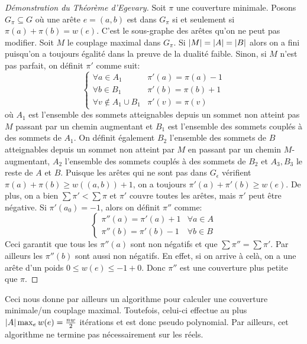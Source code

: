 \documentclass[math, info]{cours}
\begin{document}
\begin{proof}[Démonstration du Théorème d'Egevary]
	Soit $\pi$ une couverture minimale.
	Posons $G_{\pi} \subseteq G$ où une arête $e = (a, b)$ est dans $G_{\pi}$ si et seulement si $\pi(a) + \pi(b) = w(e)$.
	C'est le sous-graphe des arêtes qu'on ne peut pas modifier.
	Soit $M$ le couplage maximal dans $G_{\pi}$.
	Si $\left|M\right| = \left|A\right| = \left|B\right|$ alors on a fini puisqu'on a toujours égalité dans la preuve de la dualité faible.
	Sinon, si $M$ n'est pas parfait, on définit $\pi'$ comme suit:
	\begin{equation*}
		\begin{cases}
			\forall a \in A_{1} & \pi'(a) = \pi(a) - 1\\
			\forall b \in B_{1} & \pi'(b) = \pi(b) + 1\\
			\forall v \notin A_{1} \cup B_{1} & \pi'(v) = \pi(v)
		\end{cases}
	\end{equation*}
	où $A_{1}$ est l'ensemble des sommets atteignables depuis un sommet non atteint pas $M$ passant par un chemin augmentant et $B_{1}$ est l'ensemble des sommets couplés à des sommets de $A_{1}$.
	On définit également $B_{2}$ l'ensemble des sommets de $B$ atteignables depuis un sommet non atteint par $M$ en passant par un chemin $M$-augmentant, $A_{2}$ l'ensemble des sommets couplés à des sommets de $B_{2}$ et $A_{3}, B_{3}$ le reste de $A$ et $B$.
	Puisque les arêtes qui ne sont pas dans $G_{\epsilon}$ vérifient $\pi(a) + \pi(b) \geq w\left( (a,b) \right) + 1$, on a toujours $\pi'(a) + \pi'(b) \geq w(e)$.
	De plus, on a bien $\sum \pi' < \sum \pi$ et $\pi'$ couvre toutes les arêtes, mais $\pi'$ peut être négative.
	Si $\pi'(a_{0}) = -1$, alors on définit $\pi''$ comme:
	\begin{equation*}
		\begin{cases}
			\pi''(a) = \pi'(a) + 1 & \forall a \in A\\
			\pi''(b) = \pi'(b) - 1 & \forall b \in B
		\end{cases}
	\end{equation*}
	Ceci garantit que tous les $\pi''(a)$ sont non négatifs et que $\sum\pi'' = \sum\pi'$.
	Par ailleurs les $\pi''(b)$ sont aussi non négatifs. En effet, si on arrive à celà, on a une arête d'un poids $0 \leq w(e) \leq -1 + 0$.
	Donc $\pi''$ est une couverture plus petite que $\pi$.
\end{proof}

Ceci nous donne par ailleurs un algorithme pour calculer une couverture minimale/un couplage maximal.
Toutefois, celui-ci effectue au plus $\left|A\right|\max_{e} w(e) = \frac{nw}{2}$ itérations et est donc pseudo polynomial.
Par ailleurs, cet algorithme ne termine pas nécessairement sur les réels.
\medskip
\end{document}
